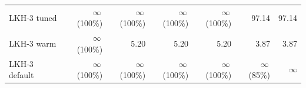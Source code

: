\begin{tabular}{lrrrrrr}
LKH-3 tuned & \ensuremath{\infty}\,{\scriptsize(100\%)} & \ensuremath{\infty}\,{\scriptsize(100\%)} & \ensuremath{\infty}\,{\scriptsize(100\%)} & \ensuremath{\infty}\,{\scriptsize(100\%)} & 97.14 & 97.14 \\
LKH-3 warm & \ensuremath{\infty}\,{\scriptsize(100\%)} & 5.20 & 5.20 & 5.20 & 3.87 & 3.87 \\
LKH-3 default & \ensuremath{\infty}\,{\scriptsize(100\%)} & \ensuremath{\infty}\,{\scriptsize(100\%)} & \ensuremath{\infty}\,{\scriptsize(100\%)} & \ensuremath{\infty}\,{\scriptsize(100\%)} & \ensuremath{\infty}\,{\scriptsize(85\%)} & \ensuremath{\infty} \\
\bottomrule
\end{tabular}

